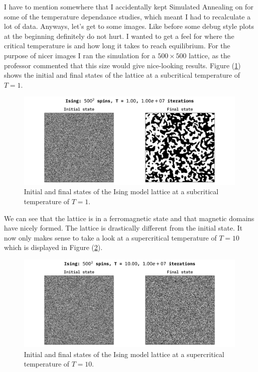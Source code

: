 \documentclass[10pt, titlepage, a4paper]{article}
\begin{document}


I have to mention somewhere that I accidentally kept Simulated Annealing on for some of the temperature dependance studies, which meant 
I had to recalculate a lot of data. Anyways, let's get to some images. Like before some debug style plots at the beginning definitely do not 
hurt. I wanted to get a feel for where the critical temperature is and how long it takes to reach equilibrium. For the purpose of 
nicer images I ran the simulation for a $500\times 500$ lattice, as the professor commented that this size would give nice-looking 
results. Figure (\ref{fig:ising-demo-subcritical}) shows the initial and final states of the lattice at a subcritical temperature of $T=1$.

\begin{figure}[H]
    \centering
    \includegraphics[width=.95\textwidth]{../IsingModel/Images/ising-demo-subcritical.png}
    \caption{Initial and final states of the Ising model lattice at a subcritical temperature of $T=1$.}
    \label{fig:ising-demo-subcritical}
\end{figure}

We can see that the lattice is in a ferromagnetic state and that magnetic domains have nicely formed. The lattice is drastically different 
from the initial state. It now only makes sense to take a look at a supercritical temperature of $T=10$ which is displayed 
in Figure (\ref{fig:ising-demo-supercritical}).

\begin{figure}[H]
    \centering
    \includegraphics[width=.95\textwidth]{../IsingModel/Images/ising-demo-supercritical.png}
    \caption{Initial and final states of the Ising model lattice at a supercritical temperature of $T=10$.}
    \label{fig:ising-demo-supercritical}
\end{figure}
\end{document}
